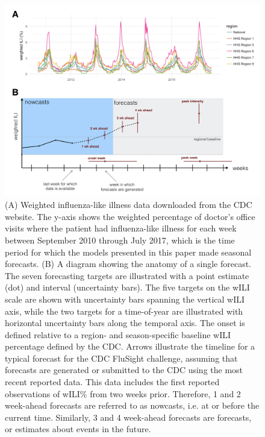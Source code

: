 \documentclass{article}\usepackage[]{graphicx}\usepackage[]{color}
\begin{document}
\begin{figure}[htbp]
\begin{center}
\includegraphics[width=\textwidth]{static-figures/timezero-sketch.pdf}
\caption{(A) Weighted influenza-like illness data downloaded from the CDC website. The y-axis shows the weighted percentage of doctor's office visits where the patient had influenza-like illness for each week between September 2010 through July 2017, which is the time period for which the models presented in this paper made seasonal forecasts. (B) A diagram showing the anatomy of a single forecast. The seven forecasting targets are illustrated with a point estimate (dot) and interval (uncertainty bars). The five targets on the wILI scale are shown with uncertainty bars spanning the vertical wILI axis, while the two targets for a time-of-year are illustrated with horizontal uncertainty bars along the temporal axis. The onset is defined relative to a region- and season-specific baseline wILI percentage defined by the CDC. Arrows illustrate the timeline for a typical forecast for the CDC FluSight challenge, assuming that forecasts are generated or submitted to the CDC using the most recent reported data. This data includes the first reported observations of wILI\% from two weeks prior. Therefore, 1 and 2 week-ahead forecasts are referred to as nowcasts, i.e. at or before the current time. Similarly, 3 and 4 week-ahead forecasts are forecasts, or estimates about events in the future.}
\label{fig:intro-schematic}
\end{center}
\end{figure}
\end{document}
